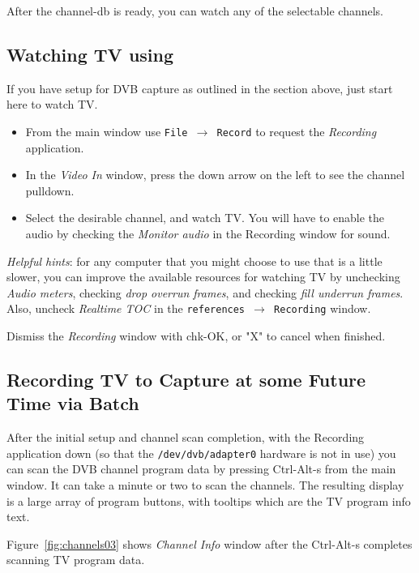 \noindent After the channel-db is ready, you can watch any of the selectable channels.

\subsection{Watching TV using \CGG{}}%
\label{sub:watching_tv_cinelerra}

If you have setup for DVB capture as outlined in the section above, just start here to watch TV.

\begin{itemize}
    \item From the main window use  \texttt{File $\rightarrow$ Record}   to request  the \textit{Recording} application.
    \item In the \textit{Video In} window, press the down arrow on the left to see the channel pulldown.
    \item Select the desirable channel, and watch TV.  You will have to enable the audio by checking the \textit{Monitor audio} in the Recording window for sound.
\end{itemize}

\textit{Helpful hints}:  for any computer that you might choose to use that is a little slower, you can improve the available resources for watching TV by unchecking \textit{Audio meters}, checking \textit{drop overrun frames}, and checking \textit{fill underrun frames}.  Also, uncheck \textit{Realtime TOC} in the \texttt{references $\rightarrow$ Recording} window.

Dismiss the \textit{Recording} window with chk-OK, or "X" to cancel when finished.

\subsection{Recording TV to Capture at some Future Time via Batch}%
\label{sub:recording_tv_future_time_batch}

After the initial setup and channel scan completion, with the Recording application down (so that the \texttt{/dev/dvb/adapter0} hardware is not in use) you can scan the DVB channel program data by pressing Ctrl-Alt-s from the main window.   It can take a minute or two to scan the channels.  The resulting display is a large array of program buttons, with tooltips which are the TV program info text.  

Figure~\ref{fig:channels03} shows \textit{Channel Info} window after the Ctrl-Alt-s completes scanning TV program data.

